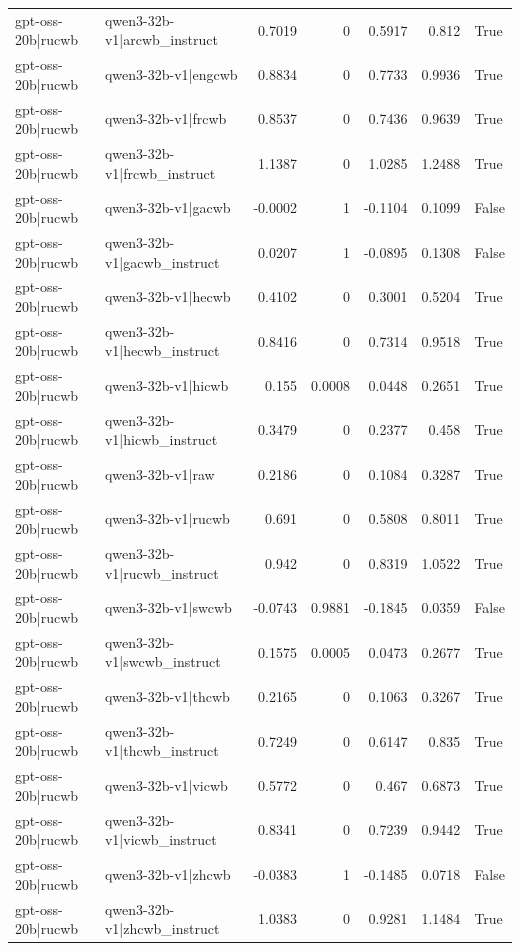 \begin{table}
\begin{tabular}{l l r r r r l}
gpt-oss-20b|rucwb & qwen3-32b-v1|arcwb_instruct & 0.7019 & 0 & 0.5917 & 0.812 & True \\
gpt-oss-20b|rucwb & qwen3-32b-v1|engcwb & 0.8834 & 0 & 0.7733 & 0.9936 & True \\
gpt-oss-20b|rucwb & qwen3-32b-v1|frcwb & 0.8537 & 0 & 0.7436 & 0.9639 & True \\
gpt-oss-20b|rucwb & qwen3-32b-v1|frcwb_instruct & 1.1387 & 0 & 1.0285 & 1.2488 & True \\
gpt-oss-20b|rucwb & qwen3-32b-v1|gacwb & -0.0002 & 1 & -0.1104 & 0.1099 & False \\
gpt-oss-20b|rucwb & qwen3-32b-v1|gacwb_instruct & 0.0207 & 1 & -0.0895 & 0.1308 & False \\
gpt-oss-20b|rucwb & qwen3-32b-v1|hecwb & 0.4102 & 0 & 0.3001 & 0.5204 & True \\
gpt-oss-20b|rucwb & qwen3-32b-v1|hecwb_instruct & 0.8416 & 0 & 0.7314 & 0.9518 & True \\
gpt-oss-20b|rucwb & qwen3-32b-v1|hicwb & 0.155 & 0.0008 & 0.0448 & 0.2651 & True \\
gpt-oss-20b|rucwb & qwen3-32b-v1|hicwb_instruct & 0.3479 & 0 & 0.2377 & 0.458 & True \\
gpt-oss-20b|rucwb & qwen3-32b-v1|raw & 0.2186 & 0 & 0.1084 & 0.3287 & True \\
gpt-oss-20b|rucwb & qwen3-32b-v1|rucwb & 0.691 & 0 & 0.5808 & 0.8011 & True \\
gpt-oss-20b|rucwb & qwen3-32b-v1|rucwb_instruct & 0.942 & 0 & 0.8319 & 1.0522 & True \\
gpt-oss-20b|rucwb & qwen3-32b-v1|swcwb & -0.0743 & 0.9881 & -0.1845 & 0.0359 & False \\
gpt-oss-20b|rucwb & qwen3-32b-v1|swcwb_instruct & 0.1575 & 0.0005 & 0.0473 & 0.2677 & True \\
gpt-oss-20b|rucwb & qwen3-32b-v1|thcwb & 0.2165 & 0 & 0.1063 & 0.3267 & True \\
gpt-oss-20b|rucwb & qwen3-32b-v1|thcwb_instruct & 0.7249 & 0 & 0.6147 & 0.835 & True \\
gpt-oss-20b|rucwb & qwen3-32b-v1|vicwb & 0.5772 & 0 & 0.467 & 0.6873 & True \\
gpt-oss-20b|rucwb & qwen3-32b-v1|vicwb_instruct & 0.8341 & 0 & 0.7239 & 0.9442 & True \\
gpt-oss-20b|rucwb & qwen3-32b-v1|zhcwb & -0.0383 & 1 & -0.1485 & 0.0718 & False \\
gpt-oss-20b|rucwb & qwen3-32b-v1|zhcwb_instruct & 1.0383 & 0 & 0.9281 & 1.1484 & True \\

\end{tabular}
\end{table}
